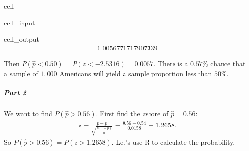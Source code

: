 \documentclass[letterpaper,10pt,english]{jupyterBook}
\begin{document}
\begin{sphinxuseclass}{cell}\begin{sphinxVerbatimInput}

\begin{sphinxuseclass}{cell_input}
\begin{sphinxVerbatim}[commandchars=\\\{\}]
\end{sphinxVerbatim}

\end{sphinxuseclass}\end{sphinxVerbatimInput}
\begin{sphinxVerbatimOutput}

\begin{sphinxuseclass}{cell_output}\begin{equation*}
\begin{split}0.0056771717907339\end{split}
\end{equation*}
\end{sphinxuseclass}\end{sphinxVerbatimOutput}

\end{sphinxuseclass}
\sphinxAtStartPar
Then \(P(\hat{p} < 0.50) = P(z < -2.5316) = 0.0057\). There is a \(0.57\%\) chance that a sample of \(1{,}000\) Americans will yield a sample proportion less than \(50\%\).


\subparagraph{Part 2}
\label{\detokenize{Ch4 The Normal Distribution and the Central Limit Theorem/4.5 The Central Limit Theorem for Proportions:part-2}}
\sphinxAtStartPar
We want to find \(P(\hat{p} > 0.56)\). First find the \(z\)\sphinxhyphen{}score of \(\hat{p} = 0.56\):
\begin{equation*}
\begin{split} z = \frac{\hat{p} - p}{\sqrt{\frac{p(1-p)}{n}}} = \frac{0.56 - 0.54}{0.0158} = 1.2658. \end{split}
\end{equation*}
\sphinxAtStartPar
So \(P(\hat{p} > 0.56) = P(z > 1.2658)\). Let’s use R to calculate the probability.
\end{document}

